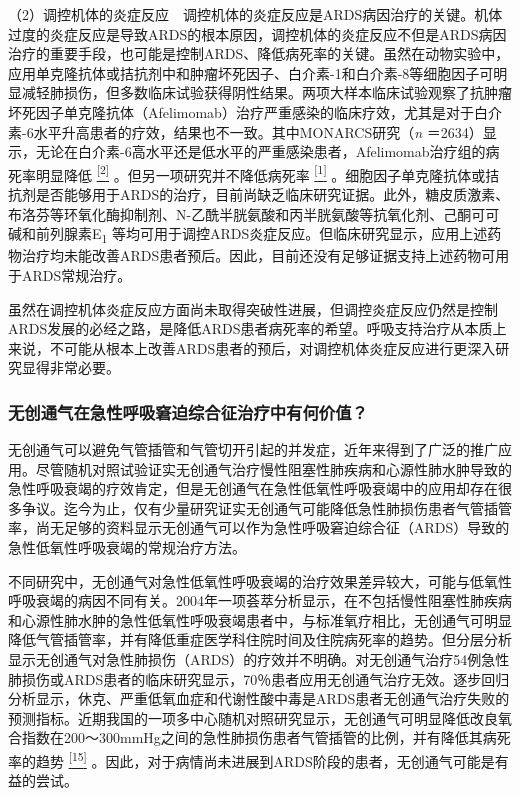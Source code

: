 （2）调控机体的炎症反应　调控机体的炎症反应是ARDS病因治疗的关键。机体过度的炎症反应是导致ARDS的根本原因，调控机体的炎症反应不但是ARDS病因治疗的重要手段，也可能是控制ARDS、降低病死率的关键。虽然在动物实验中，应用单克隆抗体或拮抗剂中和肿瘤坏死因子、白介素-1和白介素-8等细胞因子可明显减轻肺损伤，但多数临床试验获得阴性结果。两项大样本临床试验观察了抗肿瘤坏死因子单克隆抗体（Afelimomab）治疗严重感染的临床疗效，尤其是对于白介素-6水平升高患者的疗效，结果也不一致。其中MONARCS研究（\emph{n}
＝2634）显示，无论在白介素-6高水平还是低水平的严重感染患者，Afelimomab治疗组的病死率明显降低
\protect\hyperlink{text00011.htmlux5cux23ch2-10}{\textsuperscript{{[}2{]}}}
。但另一项研究并不降低病死率
\protect\hyperlink{text00011.htmlux5cux23ch1-10}{\textsuperscript{{[}1{]}}}
。细胞因子单克隆抗体或拮抗剂是否能够用于ARDS的治疗，目前尚缺乏临床研究证据。此外，糖皮质激素、布洛芬等环氧化酶抑制剂、N-乙酰半胱氨酸和丙半胱氨酸等抗氧化剂、己酮可可碱和前列腺素E\textsubscript{1}
等均可用于调控ARDS炎症反应。但临床研究显示，应用上述药物治疗均未能改善ARDS患者预后。因此，目前还没有足够证据支持上述药物可用于ARDS常规治疗。

虽然在调控机体炎症反应方面尚未取得突破性进展，但调控炎症反应仍然是控制ARDS发展的必经之路，是降低ARDS患者病死率的希望。呼吸支持治疗从本质上来说，不可能从根本上改善ARDS患者的预后，对调控机体炎症反应进行更深入研究显得非常必要。

\subsubsection{无创通气在急性呼吸窘迫综合征治疗中有何价值？}

无创通气可以避免气管插管和气管切开引起的并发症，近年来得到了广泛的推广应用。尽管随机对照试验证实无创通气治疗慢性阻塞性肺疾病和心源性肺水肿导致的急性呼吸衰竭的疗效肯定，但是无创通气在急性低氧性呼吸衰竭中的应用却存在很多争议。迄今为止，仅有少量研究证实无创通气可能降低急性肺损伤患者气管插管率，尚无足够的资料显示无创通气可以作为急性呼吸窘迫综合征（ARDS）导致的急性低氧性呼吸衰竭的常规治疗方法。

不同研究中，无创通气对急性低氧性呼吸衰竭的治疗效果差异较大，可能与低氧性呼吸衰竭的病因不同有关。2004年一项荟萃分析显示，在不包括慢性阻塞性肺疾病和心源性肺水肿的急性低氧性呼吸衰竭患者中，与标准氧疗相比，无创通气可明显降低气管插管率，并有降低重症医学科住院时间及住院病死率的趋势。但分层分析显示无创通气对急性肺损伤（ARDS）的疗效并不明确。对无创通气治疗54例急性肺损伤或ARDS患者的临床研究显示，70％患者应用无创通气治疗无效。逐步回归分析显示，休克、严重低氧血症和代谢性酸中毒是ARDS患者无创通气治疗失败的预测指标。近期我国的一项多中心随机对照研究显示，无创通气可明显降低改良氧合指数在200～300mmHg之间的急性肺损伤患者气管插管的比例，并有降低其病死率的趋势
\protect\hyperlink{text00011.htmlux5cux23ch15-10}{\textsuperscript{{[}15{]}}}
。因此，对于病情尚未进展到ARDS阶段的患者，无创通气可能是有益的尝试。

